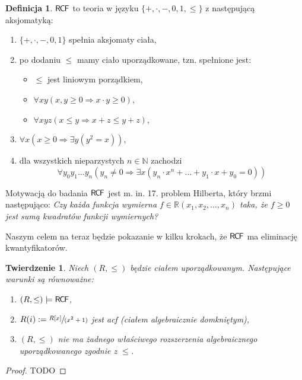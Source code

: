 \documentclass{article}
\newcommand{\N}{\mathbb{N}}
\newcommand{\R}{\mathbb{R}}
\theoremstyle{plain}
\newtheorem{tw}[thm]{Twierdzenie}
\theoremstyle{definition}
\newtheorem{df}[thm]{Definicja}
\theoremstyle{remark}
\newcommand{\RCF}{\mathsf{R \mkern-1.7mu C \mkern-1.4mu F}}
\begin{document}
\begin{df}
	 $ \RCF $ to teoria w języku $ \{ +, \cdot, -, 0, 1, \leq \} $ z następującą aksjomatyką:
	 \begin{enumerate}
		 \item $ \{+, \cdot, -, 0, 1\} $ spełnia aksjomaty ciała,
		 \item po dodaniu $\leq $ mamy ciało uporządkowane, tzn. spełnione jest:
			 \begin{itemize}
				 \item $ \leq $ jest liniowym porządkiem,
				 \item $ \forall x y (x, y \geq 0 \Rightarrow x\cdot y \geq 0) $,
				 \item $\forall x y z (x \leq y \Rightarrow x + z \leq y + z )  $,
			 \end{itemize}

		 \item $ \forall x (x \geq 0 \Rightarrow \exists y ( y^2 = x )) $,
		 \item dla wszystkich nieparzystych $ n \in \N$ zachodzi
			 \[
				 \forall y_0 y_1 \ldots y_n (y_n \neq 0 \Rightarrow \exists x (y_n \cdot x^n + \ldots + y_1 \cdot x + y_0 = 0))
		         \]
	 \end{enumerate}

\end{df}

Motywacją do badania $ \RCF $ jest m. in. 17. problem Hilberta, który brzmi następująco:
\textit{Czy każda funkcja wymierna $ f \in \R(x_1, x_2, \ldots, x_n ) $ taka, że $ f \geq 0 $ jest sumą kwadratów funkcji wymiernych?}

Naszym celem na teraz będzie pokazanie w kilku krokach, że $ \RCF $ ma eliminację kwantyfikatorów.

\begin{tw}
\label{tw:rcf}
	 Niech $ (R, \leq) $ będzie ciałem uporządkowanym.
	 Następujące warunki są równoważne:
	 \begin{enumerate}
		 \item $(R, \leq) \models \RCF $,
		 \item $R(i) := \sfrac{R[x]}{(x^2 + 1)} $ jest acf (ciałem algebraicznie domkniętym),
		 \item $ (R, \leq) $ nie ma żadnego właściwego rozszerzenia algebraicznego uporządkowanego zgodnie z $ \leq $.
	 \end{enumerate}

\end{tw}
\begin{proof}
	 TODO
\end{proof}
\end{document}
